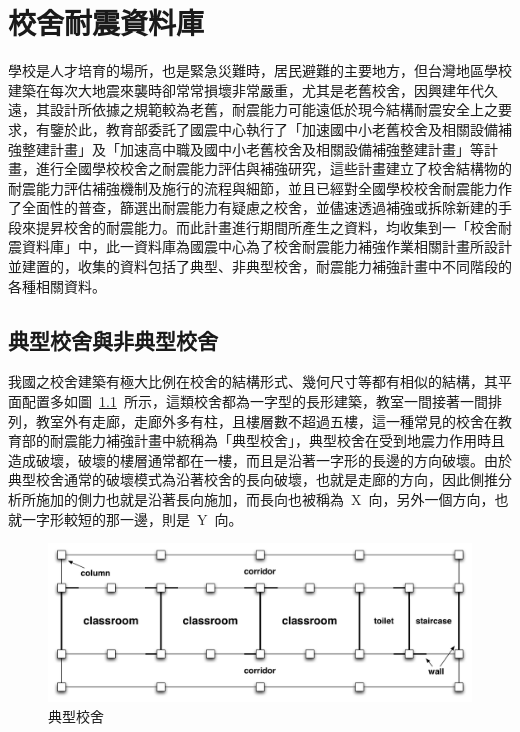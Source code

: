 \renewcommand\thetable{\arabic{chapter}-\arabic{table}}
\renewcommand{\theequation}{\arabic{chapter}-\arabic{equation}}
\chapter{校舍耐震資料庫}
\label{cha:database} 

學校是人才培育的場所，也是緊急災難時，居民避難的主要地方，但台灣地區學校建築在每次大地震來襲時卻常常損壞非常嚴重，尤其是老舊校舍，因興建年代久遠，其設計所依據之規範較為老舊，耐震能力可能遠低於現今結構耐震安全上之要求，有鑒於此，教育部委託了國震中心執行了「加速國中小老舊校舍及相關設備補強整建計畫」及「加速高中職及國中小老舊校舍及相關設備補強整建計畫」等計畫，進行全國學校校舍之耐震能力評估與補強研究，這些計畫建立了校舍結構物的耐震能力評估補強機制及施行的流程與細節，並且已經對全國學校校舍耐震能力作了全面性的普查，篩選出耐震能力有疑慮之校舍，並儘速透過補強或拆除新建的手段來提昇校舍的耐震能力。而此計畫進行期間所產生之資料，均收集到一「校舍耐震資料庫」中，此一資料庫為國震中心為了校舍耐震能力補強作業相關計畫所設計並建置的，收集的資料包括了典型、非典型校舍，耐震能力補強計畫中不同階段的各種相關資料。

\section{典型校舍與非典型校舍}

我國之校舍建築有極大比例在校舍的結構形式、幾何尺寸等都有相似的結構，其平面配置多如圖~\ref{fig:TSB}~所示，這類校舍都為一字型的長形建築，教室一間接著一間排列，教室外有走廊，走廊外多有柱，且樓層數不超過五樓，這一種常見的校舍在教育部的耐震能力補強計畫中統稱為「典型校舍」，典型校舍在受到地震力作用時且造成破壞，破壞的樓層通常都在一樓，而且是沿著一字形的長邊的方向破壞。由於典型校舍通常的破壞模式為沿著校舍的長向破壞，也就是走廊的方向，因此側推分析所施加的側力也就是沿著長向施加，而長向也被稱為~X~向，另外一個方向，也就一字形較短的那一邊，則是~Y~向。

\begin{figure}[hbtp]
  \begin{center}
    \includegraphics[width=1.0\textwidth]{figures/trad-school-building.pdf}
    \caption{典型校舍} 
    \label{fig:TSB}
  \end{center}
\end{figure}

